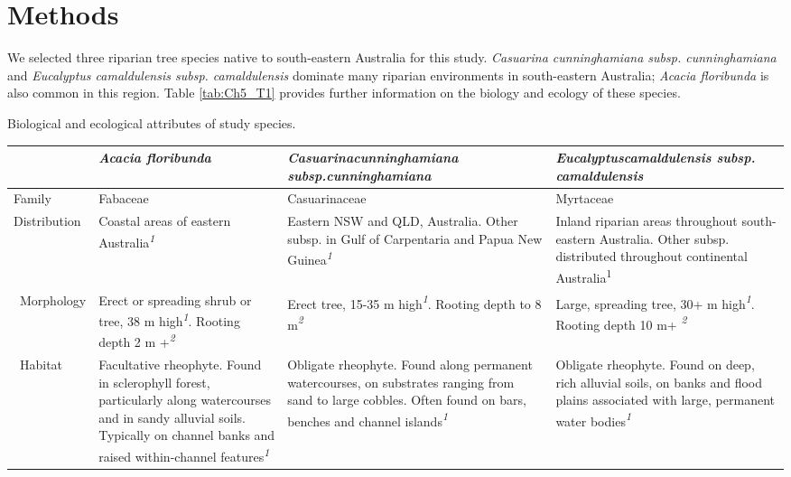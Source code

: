 \documentclass[12pt,a4paper]{memoir}
\begin{document}
\section{Methods}
We selected three riparian tree species native to south-eastern Australia for this study. \textit{Casuarina cunninghamiana subsp. cunninghamiana} and \textit{Eucalyptus camaldulensis subsp. camaldulensis} dominate many riparian environments in south-eastern Australia; \textit{Acacia floribunda} is also common in this region. Table \ref{tab:Ch5_T1} provides further information on the biology and ecology of these species.

\begin{threeparttable}[h!]
\tiny
\centering
\caption[Biological and ecological attributes of study species.]{\small{Biological and ecological attributes of study species.}}
\label{tab:Ch5_T1}
\begin{tabularx}{\textwidth}{XXXX}
\hline
 & {\textit{Acacia floribunda}} & {\textit{Casuarina\newline cunninghamiana subsp.\newline cunninghamiana}} & {\textit{Eucalyptus\newline camaldulensis subsp. camaldulensis}} \\ \hline
Family & Fabaceae & Casuarinaceae & Myrtaceae \\
Distribution & Coastal areas of eastern Australia\textit{\textsuperscript{1}} & Eastern NSW and QLD, Australia. Other subsp. in Gulf of Carpentaria and Papua New Guinea\textit{\textsuperscript{1}} & Inland riparian areas throughout south-eastern Australia. Other subsp. distributed throughout continental Australia\textsuperscript{1} \\ \
Morphology & Erect or spreading shrub or tree, 38 m high\textit{\textsuperscript{1}}. Rooting depth 2 m +\textit{\textsuperscript{2}} & Erect tree, 15-35 m high\textit{\textsuperscript{1}}. Rooting depth to 8 m\textit{\textsuperscript{2}} & Large, spreading tree, 30+ m high\textit{\textsuperscript{1}}. Rooting depth 10 m+ \textit{\textsuperscript{2}} \\ \
Habitat & Facultative rheophyte. Found in sclerophyll forest, particularly along watercourses and in sandy alluvial soils. Typically on channel banks and raised within-channel features\textit{\textsuperscript{1}} & Obligate rheophyte. Found along permanent watercourses, on substrates ranging from sand to large cobbles. Often found on bars, benches and channel islands\textit{\textsuperscript{1}} & Obligate rheophyte. Found on deep, rich alluvial soils, on banks and flood plains associated with large, permanent water bodies\textit{\textsuperscript{1}} \\ 

\end{tabularx}
\end{threeparttable}
\end{document}
